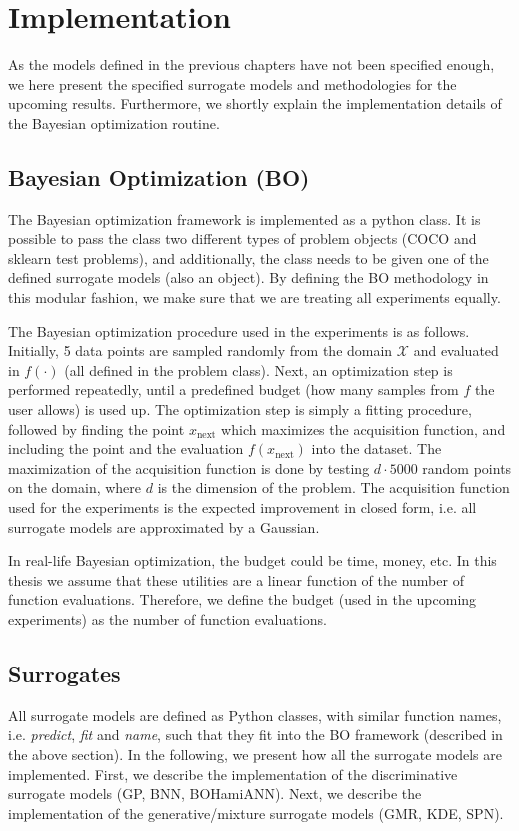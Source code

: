 \chapter{Implementation}
As the models defined in the previous chapters have not been specified enough, we here 
present the specified surrogate models and methodologies for the upcoming results. Furthermore, 
we shortly explain the implementation details of the Bayesian optimization routine. 

\section{Bayesian Optimization (BO)}\label{BO_implementation}
The Bayesian optimization framework is implemented as a python class. It is possible to pass the class two
different types of problem objects (COCO and sklearn test problems), and additionally, the class
needs to be given one of the defined surrogate models (also an object). By defining the BO methodology
in this modular fashion, we make sure that we are treating all experiments equally. 

The Bayesian optimization procedure used in the experiments is as follows. Initially, 5 data points
are sampled randomly from the domain $\mathcal{X}$ and evaluated in $f(\cdot)$ (all defined in the
problem class). Next, an optimization step is performed repeatedly, until a predefined budget (how
many samples from $f$ the user allows) is used up. The optimization step is simply a fitting
procedure, followed by finding the point $x_{\text{next}}$ which maximizes the acquisition function,
and including the point and the evaluation $f(x_{\text{next}})$ into the dataset. The maximization
of the acquisition function is done by testing $d\cdot 5000$ random points on the domain, where $d$
is the dimension of the problem. The acquisition function used for the experiments is the expected
improvement in closed form, i.e. all surrogate models are approximated by a Gaussian. 

\begin{note2}[Budget]
  In real-life Bayesian optimization, the budget could be time, money, etc. In this thesis we assume
that these utilities are a linear function of the number of function evaluations. Therefore, we
define the budget (used in the upcoming experiments) as the number of function evaluations.
\end{note2}

\section{Surrogates}
All surrogate models are defined as Python classes, with similar function names, i.e.
\textit{predict}, \textit{fit} and \textit{name}, such that they fit into the BO framework
(described in the above section). In the following, we present how all the surrogate models are
implemented. First, we describe the implementation of the discriminative surrogate models (GP, BNN, BOHamiANN). Next,  
we describe the implementation of the generative/mixture surrogate models (GMR, KDE, SPN). 

